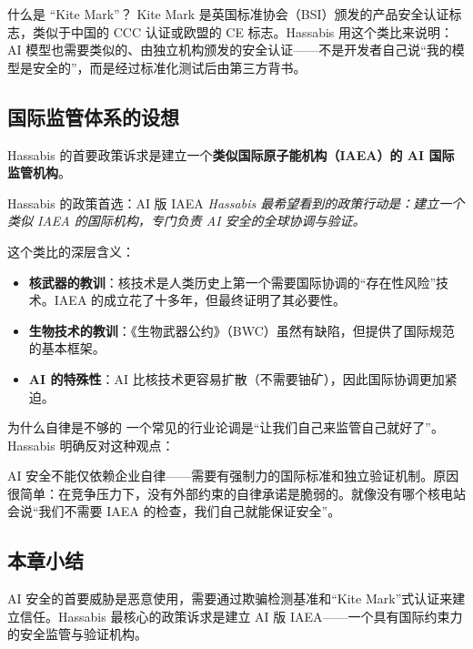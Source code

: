 \begin{knowledgebox}{什么是 ``Kite Mark''？}
Kite Mark 是英国标准协会（BSI）颁发的产品安全认证标志，类似于中国的 CCC 认证或欧盟的 CE 标志。Hassabis 用这个类比来说明：AI 模型也需要类似的、由独立机构颁发的安全认证——不是开发者自己说``我的模型是安全的''，而是经过标准化测试后由第三方背书。
\end{knowledgebox}

\subsection{国际监管体系的设想}

Hassabis 的首要政策诉求是建立一个\textbf{类似国际原子能机构（IAEA）的 AI 国际监管机构}。

\begin{importantbox}{Hassabis 的政策首选：AI 版 IAEA}
\textit{Hassabis 最希望看到的政策行动是：建立一个类似 IAEA 的国际机构，专门负责 AI 安全的全球协调与验证。}

这个类比的深层含义：
\begin{itemize}
    \item \textbf{核武器的教训}：核技术是人类历史上第一个需要国际协调的``存在性风险''技术。IAEA 的成立花了十多年，但最终证明了其必要性。
    \item \textbf{生物技术的教训}：《生物武器公约》（BWC）虽然有缺陷，但提供了国际规范的基本框架。
    \item \textbf{AI 的特殊性}：AI 比核技术更容易扩散（不需要铀矿），因此国际协调更加紧迫。
\end{itemize}
\end{importantbox}

\begin{warningbox}{为什么自律是不够的}
一个常见的行业论调是``让我们自己来监管自己就好了''。Hassabis 明确反对这种观点：

AI 安全不能仅依赖企业自律——需要有强制力的国际标准和独立验证机制。原因很简单：在竞争压力下，没有外部约束的自律承诺是脆弱的。就像没有哪个核电站会说``我们不需要 IAEA 的检查，我们自己就能保证安全''。
\end{warningbox}

\subsection{本章小结}

AI 安全的首要威胁是恶意使用，需要通过欺骗检测基准和``Kite Mark''式认证来建立信任。Hassabis 最核心的政策诉求是建立 AI 版 IAEA——一个具有国际约束力的安全监管与验证机构。

